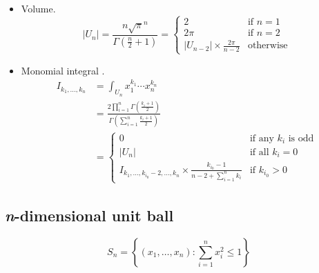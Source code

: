 \documentclass[draft]{scrartcl}
\begin{document}
\begin{itemize}
  \item Volume.
\begin{equation}\label{ndimsphere}
  |U_n|
  = \frac{n \sqrt{\pi}^n}{\Gamma(\frac{n}{2}+1)}
  = \begin{cases}
    2&\text{if $n = 1$}\\
    2\pi&\text{if $n = 2$}\\
    |U_{n-2}| \times \frac{2\pi}{n - 2}&\text{otherwise}
  \end{cases}
\end{equation}

  \item Monomial integral \cite{folland}.
\begin{align}\nonumber
  I_{k_1,\dots,k_n}
  &= \int_{U_n} x_1^{k_1}\cdots x_n^{k_n}\\
  &= \frac{2\prod_{i=1}^n
    \Gamma\left(\frac{k_i+1}{2}\right)}{\Gamma\left(\sum_{i=1}^n\frac{k_i+1}{2}\right)}\label{sphere:closed}\\
  &=\begin{cases}
    0&\text{if any $k_i$ is odd}\\
    |U_n|&\text{if all $k_i=0$}\\
    I_{k_1,\dots,k_{i_0}-2,\dots,k_n} \times \frac{k_{i_0} - 1}{n - 2 + \sum_{i=1}^n k_i}&\text{if $k_{i_0} > 0$}
  \end{cases}
\end{align}
\end{itemize}


\subsection*{\textit{n}-dimensional unit ball}
\[
  S_n = \left\{(x_1,\dots,x_n): \sum_{i=1}^n x_i^2 \le 1\right\}
\]
\end{document}
